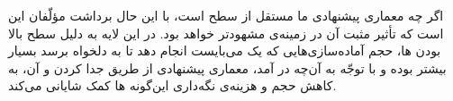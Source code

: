 اگر چه معماری پیشنهادی ما مستقل از سطح  است، با این حال برداشت مؤلّفان این است که تأثیر مثبت آن در زمینه‌ی  مشهودتر خواهد بود. در این لایه به دلیل سطح بالا بودن ها، حجم آماده‌سازی‌هایی که یک  می‌بایست انجام دهد تا به  دلخواه برسد بسیار بیشتر بوده و با توجّه به آن‌چه در  آمد، معماری پیشنهادی از طریق جدا کردن  و  آن، به کاهش حجم و هزینه‌ی نگه‌داری این‌گونه ها کمک شایانی می‌کند.

